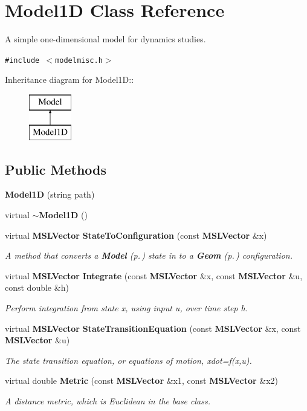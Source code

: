 \section{Model1D  Class Reference}
\label{class_Model1D}
A simple one-dimensional model for dynamics studies. 


{\tt \#include $<$modelmisc.h$>$}

Inheritance diagram for Model1D::\begin{figure}[H]
\begin{center}
\leavevmode
\includegraphics[height=2cm]{class_Model1D}
\end{center}
\end{figure}
\subsection*{Public Methods}
\begin{CompactItemize}
\item 
{\bf Model1D} (string path)
\item 
virtual {\bf $\sim$Model1D} ()
\item 
virtual {\bf MSLVector} {\bf State\-To\-Configuration} (const {\bf MSLVector} \&x)
\begin{CompactList}\small\item\em A method that converts a {\bf Model} {\rm (p.\,\pageref{class_Model})} state in to a {\bf Geom} {\rm (p.\,\pageref{class_Geom})} configuration.\item\end{CompactList}\item 
virtual {\bf MSLVector} {\bf Integrate} (const {\bf MSLVector} \&x, const {\bf MSLVector} \&u, const double \&h)
\begin{CompactList}\small\item\em Perform integration from state x, using input u, over time step h.\item\end{CompactList}\item 
virtual {\bf MSLVector} {\bf State\-Transition\-Equation} (const {\bf MSLVector} \&x, const {\bf MSLVector} \&u)
\begin{CompactList}\small\item\em The state transition equation, or equations of motion, xdot=f(x,u).\item\end{CompactList}\item 
virtual double {\bf Metric} (const {\bf MSLVector} \&x1, const {\bf MSLVector} \&x2)
\begin{CompactList}\small\item\em A distance metric, which is Euclidean in the base class.\item\end{CompactList}\end{CompactItemize}
